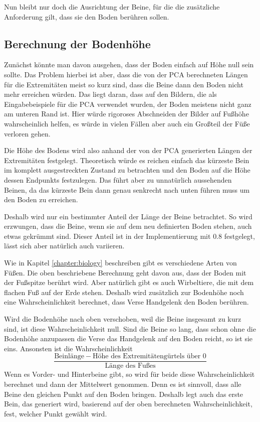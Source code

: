 Nun bleibt nur doch die Ausrichtung der Beine, für die die zusätzliche Anforderung gilt, dass sie den Boden berühren sollen.


\subsection{Berechnung der Bodenhöhe}
\label{floor_height}

Zunächst könnte man davon ausgehen, dass der Boden einfach auf Höhe null sein sollte. Das Problem hierbei ist aber, dass die von der PCA berechneten Längen für die Extremitäten meist so kurz sind, dass die Beine dann den Boden nicht mehr erreichen würden. Das liegt daran, dass auf den Bildern, die als Eingabebeispiele für die PCA verwendet wurden, der Boden meistens nicht ganz am unteren Rand ist. Hier würde rigoroses Abschneiden der Bilder auf Fußhöhe wahrscheinlich helfen, es würde in vielen Fällen aber auch ein Großteil der Füße verloren gehen.

Die Höhe des Bodens wird also anhand der von der PCA generierten Längen der Extremitäten festgelegt.
Theoretisch würde es reichen einfach das kürzeste Bein im komplett ausgestreckten Zustand zu betrachten und den Boden auf die Höhe dessen Endpunkts festzulegen.
Das führt aber zu unnatürlich aussehenden Beinen, da das kürzeste Bein dann genau senkrecht nach unten führen muss um den Boden zu erreichen.

Deshalb wird nur ein bestimmter Anteil der Länge der Beine betrachtet. So wird erzwungen, dass die Beine, wenn sie auf dem neu definierten Boden stehen, auch etwas gekrümmt sind. Dieser Anteil ist in der Implementierung mit $0.8$ festgelegt, lässt sich aber natürlich auch variieren.

Wie in Kapitel \ref{chapter:biology} beschreiben gibt es verschiedene Arten von Füßen. Die oben beschriebene Berechnung geht davon aus, dass der Boden mit der Fußspitze berührt wird. Aber natürlich gibt es auch Wirbeltiere, die mit dem flachen Fuß auf der Erde stehen.
Deshalb wird zusätzlich zur Bodenhöhe noch eine Wahrscheinlichkeit berechnet, dass Verse \bzw Handgelenk den Boden berühren.

Wird die Bodenhöhe nach oben verschoben, weil die Beine insgesamt zu kurz sind, ist diese Wahrscheinlichkeit null.
Sind die Beine so lang, dass schon ohne die Bodenhöhe anzupassen die Verse \bzw das Handgelenk auf den Boden reicht, so ist sie eins.
Ansonsten ist die Wahrscheinlichkeit 
\[\frac{\text{Beinlänge} - \text{Höhe des Extremitätengürtels über }0}{\text{Länge des Fußes}}\]
Wenn es Vorder- und Hinterbeine gibt, so wird für beide diese Wahrscheinlichkeit berechnet und dann der Mittelwert genommen. Denn es ist sinnvoll, dass alle Beine den gleichen Punkt auf den Boden bringen.
Deshalb legt auch das erste Bein, das generiert wird, basierend auf der oben berechneten Wahrscheinlichkeit, fest, welcher Punkt gewählt wird.


